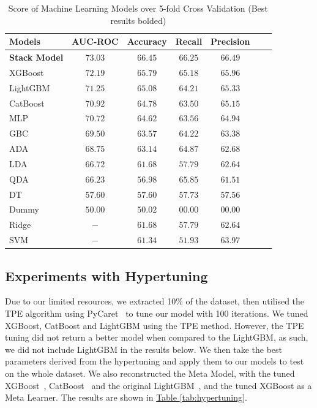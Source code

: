 \documentclass[pdflatex,sn-basic,Numbered]{sn-jnl}%
\theoremstyle{thmstyleone}%
\theoremstyle{thmstyletwo}%
\theoremstyle{thmstylethree}%
\newcommand{\reftable}[1]{\hyperref[#1]{Table \ref*{#1}}}
\begin{document}
\begin{table}[ht]
\centering
\caption{Score of Machine Learning Models over 5-fold Cross Validation (Best results bolded)}
\label{tab:allaimodels}
\begin{tabular}{@{}lcccccc@{}}
\toprule
 \textbf{Models} & \textbf{AUC-ROC} & \textbf{Accuracy} & \textbf{Recall}  & \textbf{Precision} \\ \midrule
 \textbf{Stack Model} & $\mathbf{73.03}$ & $\mathbf{66.45}$ & $\mathbf{66.25}$ & $\mathbf{66.49}$ \\ 
XGBoost & $72.19$ & $65.79$ & $65.18$ & $65.96$ \\
LightGBM & $71.25$ & $65.08$ & $64.21$ & $65.33$ \\ 
CatBoost & $70.92$ & $64.78$ & $63.50$ & $65.15$ \\ 
MLP & $70.72$ & $64.62 $ & $63.56$ & $64.94$ \\ 
GBC & $69.50$ & $63.57 $ & $64.22$ & $63.38$ \\ 
ADA & $68.75$ & $63.14$ & $64.87$ & $62.68$ \\ 
LDA & $66.72$ & $61.68$ & $57.79$ & $62.64$ \\ 
QDA & $66.23$ & $56.98$ & $65.85$ & $61.51$ \\ 
DT & $57.60$ & $57.60$ & $57.73$ & $57.56$ \\ 
Dummy & $50.00$ & $50.02$ & $00.00$ & $00.00$ \\ 
Ridge & $-$ & $61.68$ & $57.79$ & $62.64$ \\
SVM & $-$ & $61.34$ & $51.93$ & $63.97$ \\ \bottomrule
\end{tabular}%
\vspace{-1ex}
\end{table}

\subsection{Experiments with Hypertuning}\label{subsec:experiments-with-hypertuning}
Due to our limited resources, we extracted 10\% of the dataset, then utilised the TPE algorithm using PyCaret~\cite{pycaret} to tune our model with 100 iterations.
We tuned XGBoost, CatBoost and LightGBM using the TPE method.
However, the TPE tuning did not return a better model when compared to the LightGBM, as such, we did not include LightGBM in the results below.
We then take the best parameters derived from the hypertuning and apply them to our models to test on the whole dataset.
We also reconstructed the Meta Model, with the tuned XGBoost~\cite{Chen:2016:XST:2939672.2939785}, CatBoost~\cite{cat} and the original LightGBM~\cite{ke2017lightgbm}, and the tuned XGBoost as a Meta Learner. The results are shown in \reftable{tab:hypertuning}.
\end{document}
